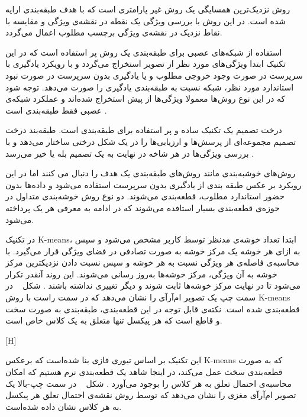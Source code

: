 روش نزدیک‌ترین همسایگی یک روش غیر پارامتری است که با هدف طبقه‌بندی ارایه شده است. در این روش با بررسی ویژگی یک نقطه در نقشه‌ی ویژگی و مقایسه با نقاط نزدیک در نقشه‌ی ویژگی برچسب مطلوب اعمال می‌گردد. 

استفاده از شبکه‌های عصبی برای طبقه‌بندی یک روش پر استفاده است که در این تکنیک ابتدا ویژگی‌های مورد نظر از تصویر استخراج می‌گردد و با رویکرد یادگیری با سرپرست در صورت وجود خروجی مطلوب و یا یادگیری بدون سرپرست در صورت نبود استاندارد مورد نظر، شبکه نسبت به طبقه‌بندی یادگیری را صورت می‌دهد. توجه شود که در این نوع روش‌ها معمولا ویژگی‌ها از پیش استخراج شده‌اند و عملکرد شبکه‌ی عصبی فقط طبقه‌بندی است .

درخت تصمیم یک تکنیک ساده و پر استفاده برای طبقه‌بندی است. طبقه‌بند درخت تصمیم مجموعه‌ای از پرسش‌ها و ارزیابی‌ها را در یک شکل درختی ساختار می‌دهد و با بررسی ویژگی‌ها در هر شاخه در نهایت به یک تصمیم بله یا خیر می‌رسد .

روش‌های خوشبه‌بندی مانند روش‌های طبقه‌بندی یک هدف را دنبال می کنند اما در این رویکرد بر عکس طبقه بندی از یادگیری بدون سرپرست استفاده می‌شود و داده‌ها بدون حضور استاندارد مطلوب، قطعه‌بندی می‌شوند. دو نوع روش خوشه‌بندی متداول در حوزه‌ی قطعه‌بندی بسیار استافده می‌شوند که در ادامه به معرفی هر یک پرداخته می‌شود.

در تکنیک K-means، ابتدا تعداد خوشه‌ی مدنظر توسط کاربر مشخص می‌شود و سپس به ازای هر خوشه یک مرکز خوشه به صورت تصادفی در فضای ویژگی قرار می‌گیرد. با محاسبه‌ی فاصله‌ی هر ویژگی نسبت به هر خوشه و سپس نسبت دادن نزدیکترین مرکز خوشه به آن ویژگی، مرکز خوشه‌ها به‌روز رسانی می‌شوند. این روند آنقدر تکرار می‌شود تا در نهایت مرکز خوشه‌ها ثابت شوند و دیگر تغییری نداشته باشند . شکل ~ در سمت چپ یک تصویر ام‌آرآی را نشان می‌دهد که در سمت راست با روش K-means قطعه‌بندی شده است. نکته‌ی قابل توجه در این قطعه‌بندی، طبقه‌بندی به صورت سخت و قاطع است که هر پیکسل تنها متعلق به یک کلاس خاص است.

[H]

این تکنیک بر اساس تیوری فازی بنا شده‌است که برعکس K-means که به صورت قطعه‌بندی سخت عمل می‌کند، در اینجا شاهد یک قطعه‌بندی نرم هستیم که امکان محاسبه‌ی احتمال تعلق به هر کلاس را بوجود می‌آورد . شکل ~ در سمت چپ-بالا یک تصویر ام‌آرآی مغزی را نشان می‌دهد که توسط روش  نقشه‌ی احتمال تعلق هر پیکسل به هر کلاس نشان داده شده‌است.

